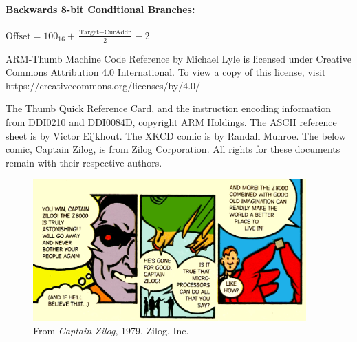 \documentclass[12pt]{article}
\begin{document}
\paragraph{Backwards 8-bit Conditional Branches:}
\( \text{Offset} = 100_{16} + \frac{\text{Target} - \text{CurAddr}}{2} - 2 \)

\newpage
{}








\printindex

\vspace{0.5cm}
ARM-Thumb Machine Code Reference by Michael Lyle is licensed under Creative Commons Attribution 4.0 International. To view a copy of this license, visit \\
https://creativecommons.org/licenses/by/4.0/

\vspace{0.5cm}
The Thumb Quick Reference Card, and the instruction encoding information from DDI0210 and DDI0084D, copyright ARM Holdings.  The ASCII reference sheet is by Victor Eijkhout. The XKCD comic is by Randall Munroe.  The below comic, Captain Zilog, is from Zilog Corporation.  All rights for these documents remain with their respective authors.

\vspace{0.1cm}

\begin{figure}[h]
    \includegraphics[width=10.5cm]{zilog.png}    
    \centering
    \caption{From \textit{Captain Zilog}, 1979, Zilog, Inc.}
\end{figure}
\end{document}
